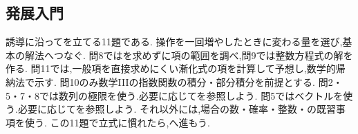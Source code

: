 \subsection{発展入門}\label{節：発展入門}
誘導に沿ってを立てる11題である.
操作を一回増やしたときに変わる量を選び,基本の解法へつなぐ.
問8ではを求めずに項の範囲を調べ,問9では整数方程式の解を作る.
問11では,一般項を直接求めにくい漸化式の項を計算して予想し,数学的帰納法で示す.
問10のみ数学IIIの指数関数の積分・部分積分を前提とする.
問2・5・7・8では数列の極限を使う.必要に応じてを参照しよう.
問5ではベクトルを使う.必要に応じてを参照しよう.
それ以外には,場合の数・確率・整数・の既習事項を使う.
この11題で立式に慣れたら,へ進もう.

